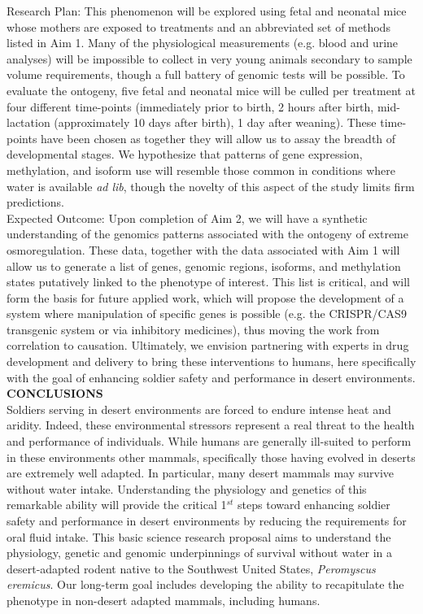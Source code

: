 \documentclass[12pt]{article}
\begin{document}
Research Plan: This phenomenon will be explored using fetal and neonatal mice whose mothers are exposed to treatments and an abbreviated set of methods listed in Aim 1. Many of the physiological measurements  (e.g. blood and urine analyses) will be impossible to collect in very young animals secondary to sample volume requirements, though a full battery of genomic tests will be possible. To evaluate the ontogeny, five fetal and neonatal mice will be culled per treatment at four different time-points (immediately prior to birth, 2 hours after birth, mid-lactation (approximately 10 days after birth), 1 day after weaning). These time-points have been chosen as together they will allow us to assay the breadth of developmental stages.  We hypothesize that patterns of gene expression, methylation, and isoform use will resemble those common in conditions where water is available \textit{ad lib}, though the novelty of this aspect of the study limits firm predictions. \\

Expected Outcome: Upon completion of Aim 2, we will have a synthetic understanding of the genomics patterns associated with the ontogeny of extreme osmoregulation. These data, together with the data associated with Aim 1 will allow us to generate a list of genes, genomic regions, isoforms, and methylation states putatively linked to the phenotype of interest. This list is critical, and will form the basis for future applied work, which will propose the development of a system where manipulation of specific genes is possible (e.g. the CRISPR/CAS9 transgenic system or via inhibitory medicines), thus moving the work from correlation to causation. Ultimately, we envision partnering with experts in drug development and delivery to bring these interventions to humans, here specifically with the goal of enhancing soldier safety and performance in desert environments.  \\



\noindent \textbf{CONCLUSIONS} \\

Soldiers serving in desert environments are forced to endure intense heat and aridity. Indeed, these environmental stressors represent a real threat to the health and performance of individuals. While humans are generally ill-suited to perform in these environments other mammals, specifically those having evolved in deserts are extremely well adapted. In particular, many desert mammals may survive without water intake. Understanding the physiology and genetics of this remarkable ability will provide the critical 1$^{st}$ steps toward enhancing soldier safety and performance in desert environments by reducing the requirements for oral fluid intake. This basic science research proposal aims to understand the physiology, genetic and genomic underpinnings of survival without water in a desert-adapted rodent native to the Southwest United States, \textit{Peromyscus eremicus}. Our long-term goal includes developing the ability to recapitulate the phenotype in non-desert adapted mammals, including humans.
\end{document}
